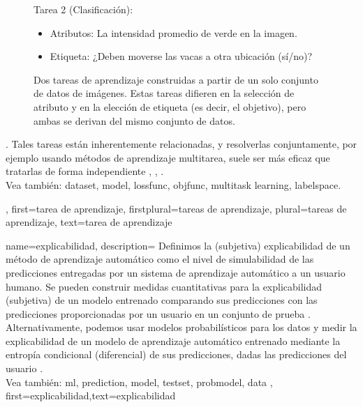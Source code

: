 {{\begin{figure}[H]
\begin{minipage}[t]{0.45\textwidth}
    Tarea 2 (Clasificación):
    \begin{itemize}
        \item Atributos: La intensidad promedio de verde en la imagen.
        \item Etiqueta: ¿Deben moverse las vacas a otra ubicación (sí/no)?
    \end{itemize}
\end{minipage}
\caption{Dos tareas de aprendizaje construidas a partir de un solo conjunto de datos de imágenes. 
Estas tareas difieren en la selección de atributo y en la elección de etiqueta (es decir, el objetivo), 
pero ambas se derivan del mismo conjunto de datos.}
\label{fig:learning_tasks_cows_dict}
\end{figure}.
Tales tareas están inherentemente relacionadas, y resolverlas conjuntamente, por ejemplo usando métodos de aprendizaje multitarea, 
suele ser más eficaz que tratarlas de forma independiente 
\cite{Caruana:1997wk}, \cite{JungGaphLassoSPL}, \cite{CSGraphSelJournal}.
\\ 
Vea también: \gls{dataset}, \gls{model}, \gls{lossfunc}, \gls{objfunc}, \gls{multitask learning}, \gls{labelspace}.},
first={tarea de aprendizaje},
firstplural={tareas de aprendizaje},
plural={tareas de aprendizaje}, 
text={tarea de aprendizaje}
}


{name={explicabilidad},
	description={
		Definimos la (subjetiva) explicabilidad de un método de aprendizaje automático
		como el nivel de simulabilidad \cite{Colin:2022aa} de las predicciones
		entregadas por un sistema de aprendizaje automático a un usuario humano.
		Se pueden construir medidas cuantitativas para la explicabilidad (subjetiva) de un modelo entrenado
		comparando sus predicciones con las predicciones proporcionadas por un usuario
		en un conjunto de prueba \cite{Zhang:2024aa,Colin:2022aa}.
		Alternativamente, podemos usar modelos probabilísticos para los datos
		y medir la explicabilidad de un modelo de aprendizaje automático entrenado mediante la entropía condicional
		(diferencial) de sus predicciones, dadas las predicciones del usuario \cite{JunXML2020,Chen2018}.
		\\
		Vea también: \gls{ml}, \gls{prediction}, \gls{model}, \gls{testset}, \gls{probmodel}, \gls{data} },
	first={explicabilidad},text={explicabilidad}
}
	
